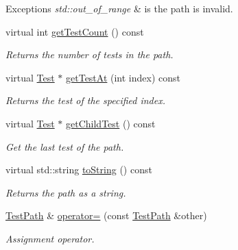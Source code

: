 \begin{DoxyCompactItemize}
\begin{DoxyCompactList}
\begin{DoxyExceptions}{Exceptions}
{\em std\+::out\+\_\+of\+\_\+range} & is the path is invalid. \\
\hline
\end{DoxyExceptions}
\end{DoxyCompactList}\item 
virtual int \hyperlink{class_test_path_aab585e5b6dcc541fd92701173de5628b}{get\+Test\+Count} () const 
\begin{DoxyCompactList}\small\item\em Returns the number of tests in the path. \end{DoxyCompactList}\item 
virtual \hyperlink{class_test}{Test} $\ast$ \hyperlink{class_test_path_a320c9cb5c72b21b59f98fa4c956d0c0b}{get\+Test\+At} (int index) const 
\begin{DoxyCompactList}\small\item\em Returns the test of the specified index. \end{DoxyCompactList}\item 
virtual \hyperlink{class_test}{Test} $\ast$ \hyperlink{class_test_path_abd8fdd67607d785e26e844ee0b90366c}{get\+Child\+Test} () const 
\begin{DoxyCompactList}\small\item\em Get the last test of the path. \end{DoxyCompactList}\item 
virtual std\+::string \hyperlink{class_test_path_a75ec4a351f0734cefbf449325d7442ee}{to\+String} () const 
\begin{DoxyCompactList}\small\item\em Returns the path as a string. \end{DoxyCompactList}\item 
\hyperlink{class_test_path}{Test\+Path} \& \hyperlink{class_test_path_aff11ba5cda48eb2a9c657e848650945f}{operator=} (const \hyperlink{class_test_path}{Test\+Path} \&other)
\begin{DoxyCompactList}\small\item\em Assignment operator. \end{DoxyCompactList}\end{DoxyCompactItemize}
